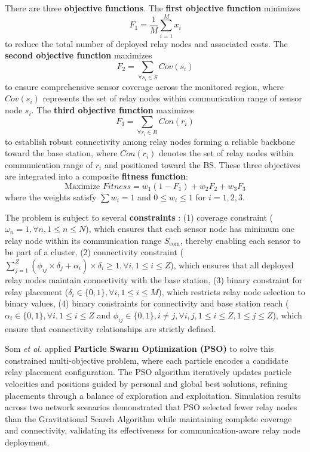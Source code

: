 There are three \textbf{objective functions}. 
The \textbf{first objective function} minimizes
\begin{equation}
F_1 = \frac{1}{M}\sum_{i=1}^{M} x_i\end{equation}
to reduce the total number of deployed relay nodes and associated costs. 
The \textbf{second objective function} maximizes
\begin{equation}
F_2 = \sum_{\forall s_i \in S} Cov(s_i)
\end{equation}
to ensure comprehensive sensor coverage across the monitored region, where \(Cov(s_i)\) represents the set of relay nodes within communication range of sensor node \(s_i\). 
The \textbf{third objective function} maximizes
\begin{equation}
F_3 = \sum_{\forall r_i \in R} Con(r_i)
\end{equation}
to establish robust connectivity among relay nodes forming a reliable backbone toward the base station, where \(Con(r_i)\) denotes the set of relay nodes within communication range of \(r_i\) and positioned toward the BS.
These three objectives are integrated into a composite \textbf{fitness function}:
\begin{equation}\text{Maximize } Fitness = w_1 (1 - F_1) + w_2 F_2 + w_3 F_3\end{equation}
where the weights satisfy \(\sum w_i = 1\) and \(0 \leq w_i \leq 1\) for \(i = 1, 2, 3\).

The problem is subject to several \textbf{constraints} :
(1) coverage constraint ($\omega_n = 1, \forall n, 1 \leq n \leq N$), which ensures that each sensor node has minimum one relay node within its communication range $S_{\text{com}}$, thereby enabling each sensor to be part of a cluster,
(2) connectivity constraint ($\sum_{j=1}^{Z} (\phi_{ij} \times \delta_j + \alpha_i) \times \delta_i \geq 1, \forall i, 1 \leq i \leq Z$), which ensures that all deployed relay nodes maintain connectivity with the base station, 
(3) binary constraint for relay placement ($\delta_i \in \{0, 1\}, \forall i, 1 \leq i \leq M$), which restricts relay node selection to binary values, 
(4) binary constraints for connectivity and base station reach ($\alpha_i \in \{0, 1\}, \forall i, 1 \leq i \leq Z$ and $\phi_{ij} \in \{0, 1\}, i \neq j, \forall i,j, 1 \leq i \leq Z, 1 \leq j \leq Z$), which ensure that connectivity relationships are strictly defined.

Som \textit{et al.} applied \textbf{Particle Swarm Optimization (PSO)} to solve this constrained multi-objective problem, where each particle encodes a candidate relay placement configuration. The PSO algorithm iteratively updates particle velocities and positions guided by personal and global best solutions, refining placements through a balance of exploration and exploitation. Simulation results across two network scenarios demonstrated that PSO selected fewer relay nodes than the Gravitational Search Algorithm while maintaining complete coverage and connectivity, validating its effectiveness for communication-aware relay node deployment.



